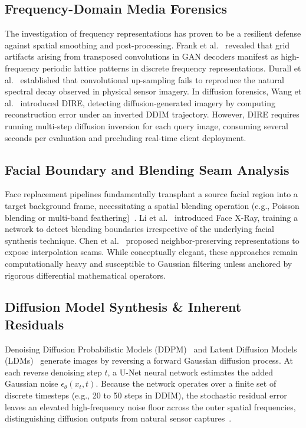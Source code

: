 \documentclass[journal]{IEEEtran}
\begin{document}
\subsection{Frequency-Domain Media Forensics}
The investigation of frequency representations has proven to be a resilient defense against spatial smoothing and post-processing. Frank et al.~\cite{frank2020leveraging} revealed that grid artifacts arising from transposed convolutions in GAN decoders manifest as high-frequency periodic lattice patterns in discrete frequency representations. Durall et al.~\cite{durall2020watch} established that convolutional up-sampling fails to reproduce the natural spectral decay observed in physical sensor imagery. In diffusion forensics, Wang et al.~\cite{wang2023dire} introduced DIRE, detecting diffusion-generated imagery by computing reconstruction error under an inverted DDIM trajectory. However, DIRE requires running multi-step diffusion inversion for each query image, consuming several seconds per evaluation and precluding real-time client deployment.

\subsection{Facial Boundary and Blending Seam Analysis}
Face replacement pipelines fundamentally transplant a source facial region into a target background frame, necessitating a spatial blending operation (e.g., Poisson blending or multi-band feathering)~\cite{perez2003poisson}. Li et al.~\cite{li2020face} introduced Face X-Ray, training a network to detect blending boundaries irrespective of the underlying facial synthesis technique. Chen et al.~\cite{chen2024npr} proposed neighbor-preserving representations to expose interpolation seams. While conceptually elegant, these approaches remain computationally heavy and susceptible to Gaussian filtering unless anchored by rigorous differential mathematical operators.

\subsection{Diffusion Model Synthesis \& Inherent Residuals}
Denoising Diffusion Probabilistic Models (DDPM)~\cite{ho2020denoising} and Latent Diffusion Models (LDMs)~\cite{rombach2022high} generate images by reversing a forward Gaussian diffusion process. At each reverse denoising step $t$, a U-Net neural network estimates the added Gaussian noise $\epsilon_\theta(x_t, t)$. Because the network operates over a finite set of discrete timesteps (e.g., 20 to 50 steps in DDIM), the stochastic residual error leaves an elevated high-frequency noise floor across the outer spatial frequencies, distinguishing diffusion outputs from natural sensor captures~\cite{dhariwal2021diffusion}.
\end{document}

